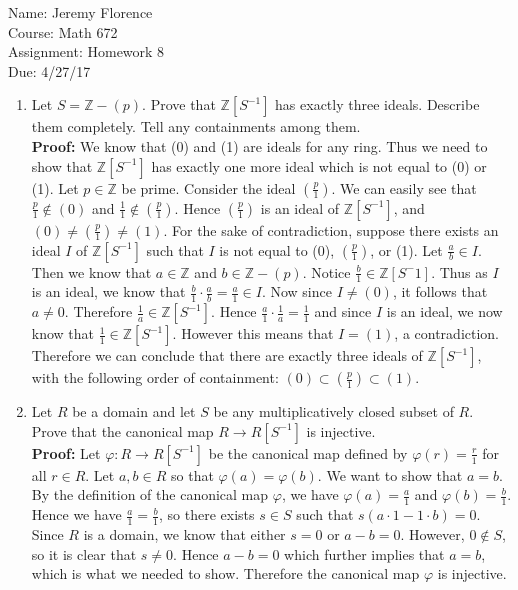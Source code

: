 \documentclass{article}
\newcommand\Proof{%
	\textbf{Proof:} %
}
\begin{document}
Name: Jeremy Florence\\
Course: Math 672\\
Assignment: Homework 8\\
Due: 4/27/17\\
\begin{enumerate}
\item Let $S=\mathbb{Z}-(p)$. Prove that $\mathbb{Z}[S^{-1}]$ has exactly three ideals. Describe them completely. Tell any containments among them.\\

\Proof We know that (0) and (1) are ideals for any ring. Thus we need to show that $\mathbb{Z}[S^{-1}]$ has exactly one more ideal which is not equal to (0) or (1). Let $p \in \mathbb{Z}$ be prime. Consider the ideal $\left(\frac{p}{1}\right)$. We can easily see that $\frac{p}{1} \not \in (0)$ and $\frac{1}{1} \not \in \left(\frac{p}{1}\right)$. Hence $\left(\frac{p}{1}\right)$ is an ideal of $\mathbb{Z}[S^{-1}]$, and $(0) \neq \left(\frac{p}{1}\right) \neq (1)$. For the sake of contradiction, suppose there exists an ideal $I$ of $\mathbb{Z}[S^{-1}]$ such that $I$ is not equal to (0), $\left(\frac{p}{1}\right)$, or (1). Let $\frac{a}{b} \in I$. Then we know that $a \in \mathbb{Z}$ and $b \in \mathbb{Z}-(p)$. Notice $\frac{b}{1} \in \mathbb{Z}[S^-1]$. Thus as $I$ is an ideal, we know that $\frac{b}{1} \cdot \frac{a}{b}=\frac{a}{1} \in I$. Now since $I \neq (0)$, it follows that $a \neq 0$. Therefore $\frac{1}{a} \in \mathbb{Z}[S^{-1}]$. Hence $\frac{a}{1} \cdot \frac{1}{a}=\frac{1}{1}$ and since $I$ is an ideal, we now know that $\frac{1}{1} \in \mathbb{Z}[S^{-1}]$. However this means that $I=(1)$, a contradiction. Therefore we can conclude that there are exactly three ideals of $\mathbb{Z}[S^{-1}]$, with the following order of containment: $(0) \subset (\frac{p}{1}) \subset (1)$. 

\item Let $R$ be a domain and let $S$ be any multiplicatively closed subset of $R$. Prove that the canonical map $R \to R[S^{-1}]$ is injective.\\

\Proof Let $\varphi:R \to R[S^{-1}]$ be the canonical map defined by $\varphi(r)=\frac{r}{1}$ for all $r \in R$. Let $a,b \in R$ so that $\varphi(a)=\varphi(b)$. We want to show that $a=b$. By the definition of the canonical map $\varphi$, we have $\varphi(a)=\frac{a}{1}$ and $\varphi(b)=\frac{b}{1}$. Hence we have $\frac{a}{1}=\frac{b}{1}$, so there exists $s \in S$ such that $s(a \cdot 1 - 1 \cdot b)=0$. Since $R$ is a domain, we know that either $s=0$ or $a-b=0$. However, $0 \not \in S$, so it is clear that $s\neq 0$. Hence $a-b=0$ which further implies that $a=b$, which is what we needed to show. Therefore the canonical map $\varphi$ is injective.\\
\end{enumerate}
\end{document}

